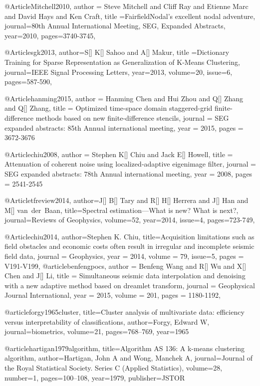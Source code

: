 @Article{Mitchell2010,
  author = {Steve Mitchell and Cliff Ray and Etienne Marc and David Hays and Ken Craft},
  title ={FairfieldNodal's excellent nodal adventure},
  journal={80th Annual International Meeting, SEG, Expanded Abstracts},
  year=2010,
  pages={3740-3745},
}

@Article{sgk2013,
  author={S[] K[] Sahoo and A[] Makur},
  title ={Dictionary Training	for	Sparse Representation as Generalization	of K-Means Clustering},
  journal={IEEE Signal Processing Letters},
  year=2013,
  volume=20,
  issue=6,
  pages={587-590},
}


@Article{hanming2015,
  author = 	 {Hanming Chen and Hui Zhou and Q[] Zhang and Q[] Zhang},
  title = 	 {Optimized time-space domain staggered-grid finite-difference methods based on new finite-difference stencils},
  journal = 	 {SEG expanded abstracts: 85th Annual international meeting},
  year = 	 2015,
  pages =	 {3672-3676}
}

@Article{chiu2008,
  author = 	 {Stephen K[] Chiu and Jack E[] Howell},
  title = 	 {Attenuation of coherent noise using localized‐adaptive eigenimage filter},
  journal = 	 {SEG expanded abstracts: 78th Annual international meeting},
  year = 	 2008,
  pages =	 {2541-2545}
}



@Article{tfreview2014,
author={J[] B[] Tary and R[] H[] Herrera and J[] Han and M[] van~der~Baan},
title={Spectral estimation—What is new? What is next?},
journal={Reviews of Geophysics},
volume=52,
year=2014,
issue=4,
pages={723-749},
}

@Article{chiu2014,
  author={Stephen K. Chiu},
  title={Acquisition limitations such as field obstacles and economic costs often result in irregular and incomplete seismic field data},
  journal = 	 {Geophysics},
  year = 	 2014,
  volume =	 79,
  issue=5,
  pages =	 {V191-V199},
}
@article{benfengpocs,
  author =	 {Benfeng Wang and R[] Wu and X[] Chen and J[] Li},
  title =	 {Simultaneous seismic data interpolation and denoising with a new adaptive method based on dreamlet transform},
  journal = 	 {Geophysical Journal International},
  year = 	 2015,
  volume =	 201,
  pages =	 {1180-1192},
}


@article{forgy1965cluster,
  title={Cluster analysis of multivariate data: efficiency versus interpretability of classifications},
  author={Forgy, Edward W},
  journal={biometrics},
  volume={21},
  pages={768--769},
  year={1965}
}

@article{hartigan1979algorithm,
  title={Algorithm AS 136: A k-means clustering algorithm},
  author={Hartigan, John A and Wong, Manchek A},
  journal={Journal of the Royal Statistical Society. Series C (Applied Statistics)},
  volume={28},
  number={1},
  pages={100--108},
  year={1979},
  publisher={JSTOR}
}

